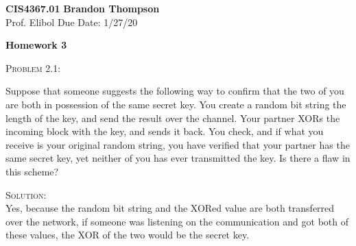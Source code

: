 \documentclass[12pt]{article}
\newenvironment{problem}[1]
{\begin{mdframed}[linewidth=0.8pt]
        \textsc{Problem #1:}

}
    {\end{mdframed}}
\newenvironment{solution}
    {\textsc{Solution:}\\}
    {\newpage}%
\begin{document}
\noindent
\textbf{CIS4367.01} \hfill \textbf{Brandon Thompson} \\
\normalsize Prof. Elibol \hfill Due Date: 1/27/20 \\

\begin{center}
\textbf{Homework 3}
\end{center}
	\begin{problem}{2.1}
		Suppose that someone suggests the following way to confirm that
		the two of you are both in possession of the same secret key.
		You create a random bit string the length of the key, and send
		the result over the channel. Your partner XORs the incoming block
		with the key, and sends it back. You check, and if what you 
		receive is your original random string, you have verified that
		your partner has the same secret key, yet neither of you has
		ever transmitted the key. Is there a flaw in this scheme?
	\end{problem}
	\begin{solution}
		Yes, because the random bit string and the XORed value are both
		transferred over the network, if someone was listening on the
		communication and got both of these values, the XOR of the two
		would be the secret key.
	\end{solution}
\end{document}
